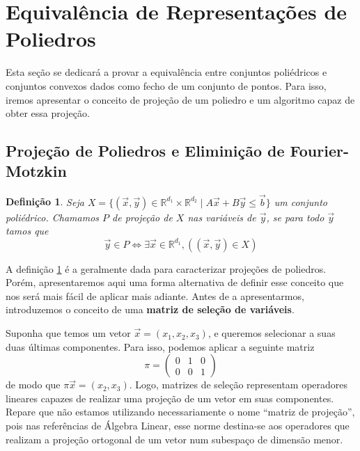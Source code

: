 \newtheorem{def:projecao1}[def:conjunto convexo]{Definição}
\newtheorem{def:projecao2}[def:conjunto convexo]{Definição}

\section{Equivalência de Representações de Poliedros}

Esta seção se dedicará a provar a equivalência entre conjuntos poliédricos e
conjuntos convexos dados como fecho de um conjunto de pontos. Para isso, iremos
apresentar o conceito de projeção de um poliedro e um algoritmo capaz de obter
essa projeção.

\subsection{Projeção de Poliedros e Eliminição de Fourier-Motzkin}

\begin{def:projecao1}
  \label{def:projecao1}
  Seja $X = \{(\vec x, \vec y) \in \mathbb{R}^{d_1} \times \mathbb{R}^{d_2}
  \mid A \vec x + B \vec y \leq \vec b\}$
 um conjunto poliédrico. Chamamos $P$ de projeção de $X$ nas variáveis de
 $\vec y$, se para todo $\vec y$ tamos que
 \[
   \vec y \in P \Leftrightarrow \exists \vec x \in \mathbb{R}^{d_1}, (
   (\vec x, \vec y) \in X )
  \]
\end{def:projecao1}

A definição \ref{def:projecao1} é a geralmente dada para caracterizar projeções
de poliedros. Porém, apresentaremos aqui uma forma alternativa de definir esse
conceito que nos será mais fácil de aplicar mais adiante. Antes de a
apresentarmos, introduzemos o conceito de uma \textbf{matriz de seleção de
variáveis}.

Suponha que temos um vetor $\vec x = (x_1, x_2, x_3)$, e queremos selecionar
a suas duas últimas componentes. Para isso, podemos aplicar a seguinte matriz
\[
 \pi = \begin{pmatrix}
  0 & 1 & 0 \\
  0 & 0 & 1
 \end{pmatrix}
\]
de modo que $\pi \vec x = (x_2, x_3)$. Logo, matrizes de seleção representam
operadores lineares capazes de realizar uma projeção de um vetor em suas
componentes. Repare que não estamos utilizando necessariamente o nome ``matriz
de projeção'', pois nas referências de Álgebra Linear, esse norme destina-se aos
operadores que realizam a projeção ortogonal de um vetor num subespaço de
dimensão menor.

